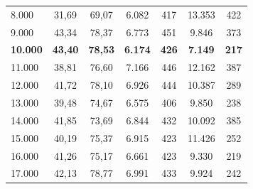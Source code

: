 \begin{table}[ht]
\begin{tabular}{lcccccc}
8.000               & 31,69                                                             & 69,07                                                           & 6.082              & 417               & 13.353             & 422              \\
9.000               & 43,34                                                             & 78,37                                                           & 6.773              & 451               & 9.846              & 373              \\
\textbf{10.000}     & \textbf{43,40}                                                    & \textbf{78,53}                                                  & \textbf{6.174}     & \textbf{426}      & \textbf{7.149}     & \textbf{217}     \\
11.000              & 38,81                                                             & 76,60                                                           & 7.166              & 446               & 12.162             & 387              \\
12.000              & 41,72                                                             & 78,10                                                           & 6.926              & 444               & 10.387             & 289              \\
13.000              & 39,48                                                             & 74,67                                                           & 6.575              & 406               & 9.850              & 238              \\
14.000              & 41,85                                                             & 73,69                                                           & 6.844              & 432               & 10.092             & 385              \\
15.000              & 40,19                                                             & 75,37                                                           & 6.915              & 423               & 11.426             & 252              \\
16.000              & 41,26                                                             & 75,17                                                           & 6.661              & 423               & 9.330              & 219              \\
17.000              & 42,13                                                             & 78,77                                                           & 6.991              & 433               & 9.924              & 242              \\

\end{tabular}
\end{table}
